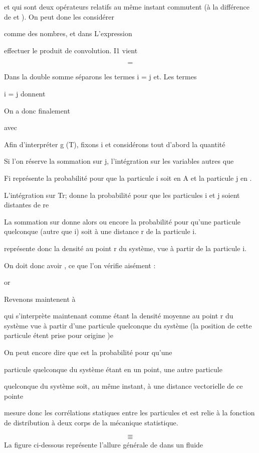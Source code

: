  et  qui sont deux opérateurs relatifs au même instant
commutent (à la différence de  et ). On peut done les considérer

comme des nombres, et dans L'expression

effectuer le produit de convolution. I1 vient

\[
\tag{136}=
\]


Dans la double somme séparons les termes i = j et. Les termes

i = j donnent

On a donc finalement

avec

Afin d'interpréter g (T), fixons i et considérons tout d'abord la quantité

Si l'on réserve la sommation sur j, l'intégration sur les variables autres que

Fi représente la probabilité pour que la particule i soit en A et la particule
j en  .

L'intégration sur Tr; donne la probabilité pour que les particules
i et j soient distantes de re

La sommation sur  donne alors  ou encore la probabilité
pour qu'une particule quelconque (autre que i) soit à une distance r de la
particule i.


 représente donc la densité au point r du système, vue à partir de
la particule i.

On doit donc avoir , ce que l'on vérifie
aisément :

or

Revenons maintenent à 

qui s'interprète maintenant comme étant la densité moyenne au point r du
système vue à partir d'une particule quelconque du système (la position de
cette particule étent prise pour origine )e

On peut encore dire que  est la probabilité pour qu'une

particule quelconque du système étant en un point, une autre particule

quelconque du système soit, au même instant, à une distance vectorielle
de ce pointe

 mesure donc les corrélations statiques entre les particules et est relie
à la fonction de distribution à deux corps de la mécanique statistique.

\[
\tag{137}=
\]
\[
\tag{138}=
\]
La figure ci-dessous représente l'allure générale de  dans un fluide

